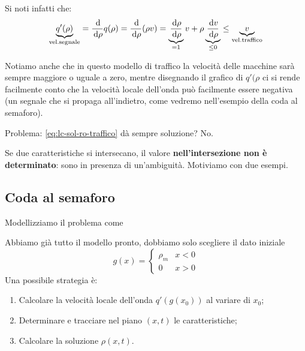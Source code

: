 Si noti infatti che:
\begin{equation*}
    \underbrace{q'(\rho)}_{\text{vel.segnale}} = \frac{\,\mathrm d}{\,\mathrm d \rho}q(\rho) = \frac{\,\mathrm d}{\,\mathrm d \rho}(\rho v) = \underbrace{\frac{\,\mathrm d \rho }{\,\mathrm d \rho }}_{=1}v + \rho \underbrace{\frac{\,\mathrm d v}{\,\mathrm d \rho}}_{\le 0} \le \underbrace{v}_{\text{vel.traffico}}
\end{equation*}

Notiamo anche che in questo modello di traffico la velocità delle macchine sarà sempre maggiore o uguale a zero, mentre disegnando il grafico di $q'(\rho $ ci si rende facilmente conto che la velocità locale dell'onda può facilmente essere negativa (un segnale che si propaga all'indietro, come vedremo nell'esempio della coda al semaforo).

Problema: \eqref{eq:lc-sol-ro-traffico} dà sempre soluzione? No.


Se due caratteristiche si intersecano, il valore \textbf{nell'intersezione non è determinato}: sono in presenza di un'ambiguità. Motiviamo con due esempi.
\subsection{Coda al semaforo}

Modellizziamo il problema come

Abbiamo già tutto il modello pronto, dobbiamo solo scegliere il dato iniziale
\begin{equation}
    g(x) =
    \begin{cases}
        \rho _{m} & x< 0 \\
        0         & x >0
    \end{cases}
\end{equation}
Una possibile strategia è:
\begin{enumerate}
    \item Calcolare la velocità locale dell'onda $q'(g(x_{0}))$ al variare di $x_{0}$;
    \item Determinare e tracciare nel piano $(x,t)$ le caratteristiche;
    \item Calcolare la soluzione $\rho (x,t)$.
\end{enumerate}

